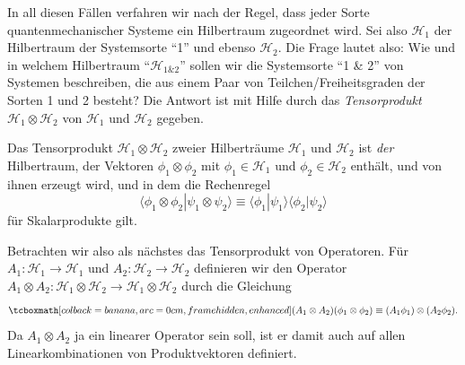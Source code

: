 In all diesen Fällen verfahren wir nach der Regel, dass jeder Sorte quantenmechanischer
Systeme ein Hilbertraum zugeordnet wird. Sei also $\mathcal{H}_1$ der Hilbertraum der Systemsorte ``1'' und ebenso $\mathcal{H}_2$. Die Frage lautet also: Wie und in welchem Hilbertraum ``$\mathcal{H}_{\text{$1$\&$2$}}$'' sollen wir die Systemsorte ``1 \& 2'' von Systemen beschreiben, die aus einem Paar von Teilchen/Freiheitsgraden der Sorten 1 und 2 besteht? Die Antwort ist mit Hilfe durch das \emph{Tensorprodukt} $\mathcal{H}_1\otimes \mathcal{H}_2$ von $\mathcal{H}_1$ und $\mathcal{H}_2$ gegeben.

\begin{center}
\parbox[c][5cm][c]{14cm}{\begin{tcolorbox}[colback=banana,arc=0cm,frame hidden,enhanced]{Das Tensorprodukt $\mathcal{H}_1\otimes \mathcal{H}_2$ zweier Hilberträume $\mathcal{H}_1$ und $\mathcal{H}_2$ ist \emph{der} Hilbertraum, der Vektoren $\phi_1\otimes \phi_2$ mit $\phi_1\in \mathcal{H}_1$ und $\phi_2\in \mathcal{H}_2$ enthält, und von ihnen erzeugt wird, und in dem die Rechenregel 
\begin{equation}
	\langle \phi_1\otimes \phi_2|\psi_1\otimes\psi_2\rangle \equiv \langle\phi_1| \psi_1\rangle\langle\phi_2| \psi_2\rangle
\end{equation}
für Skalarprodukte gilt.
}\end{tcolorbox}}
\end{center}

Betrachten wir also als nächstes das Tensorprodukt von Operatoren. Für $A_1:\mathcal{H}_1 \rightarrow \mathcal{H}_1$ und $A_2:\mathcal{H}_2 \rightarrow \mathcal{H}_2$ definieren wir den Operator $A_1\otimes A_2:\mathcal{H}_1 \otimes\mathcal{H}_2 \rightarrow \mathcal{H}_1 \otimes\mathcal{H}_2$ durch die Gleichung
\begin{equation}
	\eqbox{(A_1\otimes A_2)(\phi_1\otimes \phi_2) \equiv (A_1\phi_1)\otimes (A_2\phi_2).}
\end{equation}
Da $A_1\otimes A_2$ ja ein linearer Operator sein soll, ist er damit auch auf allen
Linearkombinationen von Produktvektoren definiert.

